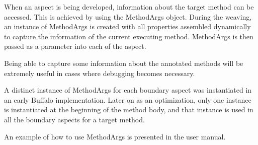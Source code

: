 When an aspect is being developed, information about the target method can be accessed. This is achieved by using the MethodArgs object. During the weaving, an instance of MethodArgs is created with all properties assembled dynamically to capture the information of the current executing method. MethodArgs is then passed as a parameter into each of the aspect.

Being able to capture some information about the annotated methods will be  extremely useful in cases where debugging becomes necessary.

A distinct instance of MethodArgs for each boundary aspect was instantiated in an early Buffalo implementation. Later on as an optimization, only one instance is instantiated at the beginning of the method body, and that instance is used in all the boundary aspects for a target method.

An example of how to use MethodArgs is presented in the user manual.
